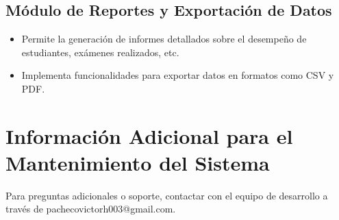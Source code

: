 \documentclass[a4paper,12pt]{article}
\begin{document}
\subsection{Módulo de Reportes y Exportación de Datos}
\begin{itemize}
	\item Permite la generación de informes detallados sobre el desempeño de estudiantes, exámenes realizados, etc.
	\item  Implementa funcionalidades para exportar datos en formatos como CSV y PDF.

\end{itemize}


\section{Información Adicional para el Mantenimiento del Sistema}
Para preguntas adicionales o soporte, contactar con el equipo de desarrollo a través de pachecovictorh003@gmail.com.
\end{document}
